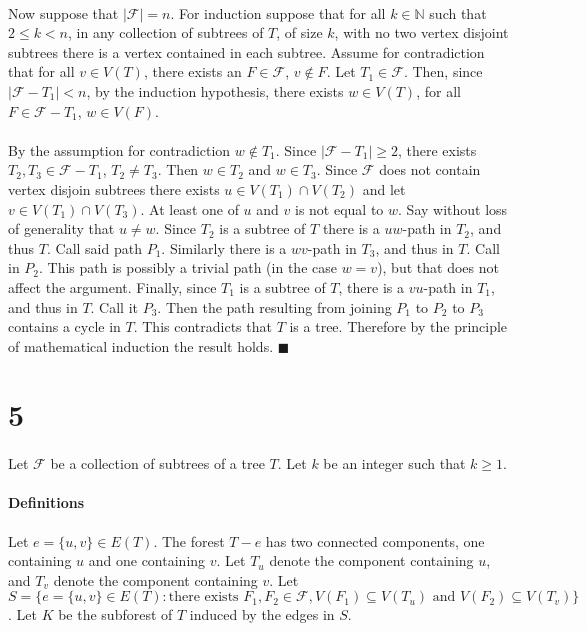 \documentclass[letterpaper,12pt,oneside,onecolumn]{report}
\begin{document}
\paragraph{}
Now suppose that $|\mathcal{F}| = n$. For induction suppose that for all $k \in \mathbb{N}$ such that $2 \leq k < n$, in any collection of subtrees of $T$, of size $k$, with no two vertex disjoint subtrees there is a vertex contained in each subtree. Assume for contradiction that for all $v \in V(T)$, there exists an $F \in \mathcal{F}$, $v \not\in F$. Let $T_1 \in \mathcal{F}$. Then, since $|\mathcal{F} - T_1| < n$, by the induction hypothesis, there exists $w \in V(T)$, for all $F \in \mathcal{F} - T_1$, $w \in V(F)$.
\paragraph{}
 By the assumption for contradiction $w \not\in T_1$. Since $|\mathcal{F} - T_1| \geq 2$, there exists $T_2, T_3 \in \mathcal{F} - T_1$, $T_2 \neq T_3$. Then $w \in T_2$ and $w \in T_3$. Since $\mathcal{F}$ does not contain vertex disjoin subtrees there exists $u \in V(T_1) \cap V(T_2)$ and let $v \in V(T_1) \cap V(T_3)$. At least one of $u$ and $v$ is not equal to $w$. Say without loss of generality that $u \neq w$. Since $T_2$ is a subtree of $T$ there is a $uw$-path in $T_2$, and thus $T$. Call said path $P_1$. Similarly there is a $wv$-path in $T_3$, and thus in $T$. Call in $P_2$. This path is possibly a trivial path (in the case $w=v$), but that does not affect the argument. Finally, since $T_1$ is a subtree of $T$, there is a $vu$-path in $T_1$, and thus in $T$. Call it $P_3$. Then the path resulting from joining $P_1$ to $P_2$ to $P_3$ contains a cycle in $T$. This contradicts that $T$ is a tree. Therefore by the principle of mathematical induction the result holds. $\blacksquare$
\section*{5}
\paragraph{}
Let $\mathcal{F}$ be a collection of subtrees of a tree $T$. Let $k$ be an integer such that $k \geq 1$.
\paragraph{Definitions}
Let $e=\{u,v\} \in E(T)$. The forest $T-e$ has two connected components, one containing $u$ and one containing $v$. Let $T_u$ denote the component containing $u$, and $T_v$ denote the component containing $v$. Let $S = \{e=\{u,v\} \in E(T) : \text{there exists } F_1,F_2 \in \mathcal{F}, V(F_1) \subseteq V(T_u) \text{ and } V(F_2) \subseteq V(T_v)\}$. Let $K$ be the subforest of $T$ induced by the edges in $S$.
\end{document}
